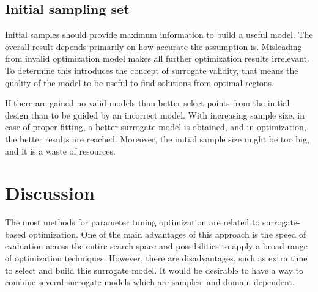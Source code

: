         \subsection{Initial sampling set}
        Initial samples should provide maximum information to build a useful model. The overall result depends primarily on how accurate the assumption is. Misleading from invalid optimization model makes all further optimization results irrelevant. To determine this introduces the concept of surrogate validity, that means the quality of the model to be useful to find solutions from optimal regions. 

        If there are gained no valid models than better select points from the initial design than to be guided by an incorrect model. With increasing sample size, in case of proper fitting, a better surrogate model is obtained, and in optimization, the better results are reached. Moreover, the initial sample size might be too big, and it is a waste of resources. 


    \section{Discussion}
    The most methods for parameter tuning optimization are related to surrogate-based optimization. One of the main advantages of this approach is the speed of evaluation across the entire search space and possibilities to apply a broad range of optimization techniques. However, there are disadvantages, such as extra time to select and build this surrogate model. 
    It would be desirable to have a way to combine several surrogate models which are samples- and domain-dependent.



